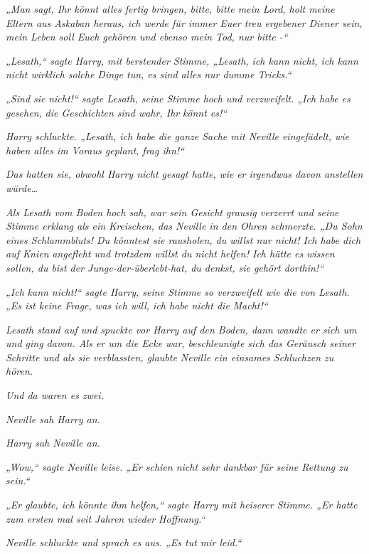 {\emph{„Man sagt, Ihr könnt alles fertig bringen, bitte, bitte mein Lord, holt meine Eltern aus Askaban heraus, ich werde für immer Euer treu ergebener Diener sein, mein Leben soll Euch gehören und ebenso mein Tod, nur bitte -“}

\emph{„Lesath,“ sagte Harry, mit berstender Stimme, „Lesath, ich kann nicht, ich kann nicht wirklich solche Dinge tun, es sind alles nur dumme Tricks.“}

\emph{„Sind sie} \emph{\emph{nicht!}“ sagte Lesath, seine Stimme hoch und verzweifelt. „Ich habe es} \emph{\emph{gesehen,}} \emph{die Geschichten sind wahr, Ihr} \emph{\emph{könnt es!}“}

\emph{Harry schluckte. „Lesath, ich habe die ganze Sache mit Neville eingefädelt, wie haben alles im Voraus geplant, frag ihn!“}

\emph{Das hatten sie, obwohl Harry nicht gesagt hatte,} \emph{\emph{wie}} \emph{er irgendwas davon anstellen würde…}

\emph{Als Lesath vom Boden hoch sah, war sein Gesicht grausig verzerrt und seine Stimme erklang als ein Kreischen, das Neville in den Ohren schmerzte. „\emph{Du Sohn eines Schlammbluts! Du könntest sie rausholen, du willst nur nicht! Ich habe dich}} \emph{\emph{auf Knien}} \emph{\emph{angefleht und trotzdem willst du nicht helfen! Ich hätte es wissen sollen, du bist der Junge-der-überlebt-hat, du denkst, sie gehört dorthin!}“}

\emph{„Ich} \emph{\emph{kann nicht!}“ sagte Harry, seine Stimme so verzweifelt wie die von Lesath. „Es ist keine Frage, was ich will, ich habe nicht die} \emph{\emph{Macht!}“}

\emph{Lesath stand auf und spuckte vor Harry auf den Boden, dann wandte er sich um und ging davon. Als er um die Ecke war, beschleunigte sich das Geräusch seiner Schritte und als sie verblassten, glaubte Neville ein einsames Schluchzen zu hören.}

\emph{Und da waren es zwei.}

\emph{Neville sah Harry an.}

\emph{Harry sah Neville an.}

\emph{„Wow,“ sagte Neville leise. „Er schien nicht sehr dankbar für seine Rettung zu sein.“}

\emph{„Er glaubte, ich könnte ihm helfen,“ sagte Harry mit heiserer Stimme. „Er hatte zum ersten mal seit Jahren wieder Hoffnung.“}

\emph{Neville schluckte und sprach es aus. „Es tut mir leid.“}

}

